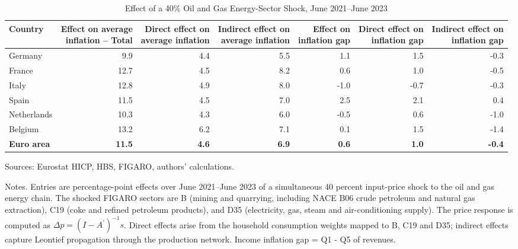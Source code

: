\documentclass[11pt]{article}
\begin{document}
\begin{table}[H]
\centering
\caption{Effect of a 40\% Oil and Gas Energy-Sector Shock, June 2021--June 2023}
\scriptsize
\setlength{\tabcolsep}{4.2pt}
\begin{tabular}{lrrrrrr}
\toprule
Country & \shortstack{Effect on average\\inflation -- Total} & \shortstack{Direct effect on\\average inflation} & \shortstack{Indirect effect on\\average inflation} & \shortstack{Effect on\\inflation gap} & \shortstack{Direct effect on\\inflation gap} & \shortstack{Indirect effect on\\inflation gap}
 \\
\midrule
Germany & 9.9 & 4.4 & 5.5 & 1.1 & 1.5 & -0.3
 \\
France & 12.7 & 4.5 & 8.2 & 0.6 & 1.0 & -0.5
 \\
Italy & 12.8 & 4.9 & 8.0 & -1.0 & -0.7 & -0.3
 \\
Spain & 11.5 & 4.5 & 7.0 & 2.5 & 2.1 & 0.4
 \\
Netherlands & 10.3 & 4.3 & 6.0 & -0.5 & 0.6 & -1.0
 \\
Belgium & 13.2 & 6.2 & 7.1 & 0.1 & 1.5 & -1.4
 \\
\midrule
\textbf{Euro area} & \textbf{11.5} & \textbf{4.6} & \textbf{6.9} & \textbf{0.6} & \textbf{1.0} & \textbf{-0.4}
 \\
\bottomrule
\end{tabular}
\par\vspace{0.35em}\footnotesize\noindent Sources: Eurostat HICP, HBS, FIGARO, authors' calculations.
\par\vspace{0.25em}\footnotesize\noindent Notes. Entries are percentage-point effects over June 2021--June 2023 of a simultaneous 40 percent input-price shock to the oil and gas energy chain. The shocked FIGARO sectors are B (mining and quarrying, including NACE B06 crude petroleum and natural gas extraction), C19 (coke and refined petroleum products), and D35 (electricity, gas, steam and air-conditioning supply). The price response is computed as $\Delta p = (I - A^{\prime})^{-1}s$. Direct effects arise from the household consumption weights mapped to B, C19 and D35; indirect effects capture Leontief propagation through the production network. Income inflation gap = Q1 - Q5 of revenues.
\end{table}
\vspace{0.6em}
\end{document}
